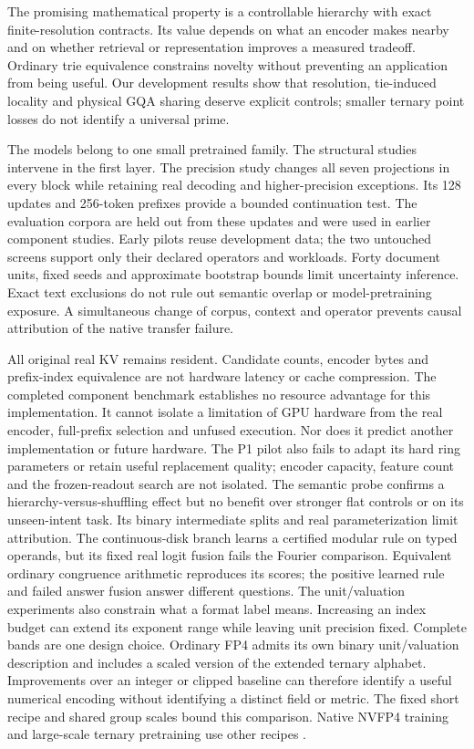\documentclass[11pt]{article}
\begin{document}
The promising mathematical property is a controllable hierarchy with exact
finite-resolution contracts. Its value depends on what an encoder makes
nearby and on whether retrieval or representation improves a measured
tradeoff. Ordinary trie equivalence constrains novelty without preventing
an application from being useful. Our development results show that
resolution, tie-induced locality and physical GQA sharing deserve explicit
controls; smaller ternary point losses do not identify a universal prime.

The models belong to one small pretrained family. The structural studies
intervene in the first layer. The precision study changes all seven
projections in every block while retaining real decoding and higher-precision
exceptions. Its 128 updates and 256-token prefixes provide a bounded
continuation test. The evaluation corpora are held out from these updates
and were used in earlier component studies. Early pilots reuse development data; the two
untouched screens support only their declared operators and workloads.
Forty document units, fixed seeds and approximate bootstrap bounds limit
uncertainty inference. Exact text exclusions do not rule out semantic overlap
or model-pretraining exposure. A simultaneous change of corpus, context and
operator prevents causal attribution of the native transfer failure.

All original real KV remains resident. Candidate counts, encoder bytes and
prefix-index equivalence are not hardware latency or cache compression.
The completed component benchmark establishes no resource advantage for this
implementation. It cannot isolate a limitation of GPU hardware from the
real encoder, full-prefix selection and unfused execution. Nor does it
predict another implementation or future hardware. The P1 pilot also fails
to adapt its hard ring parameters or retain useful replacement quality;
encoder capacity, feature count and the frozen-readout search are not isolated.
The semantic probe confirms a hierarchy-versus-shuffling effect but no benefit
over stronger flat controls or on its unseen-intent task. Its binary
intermediate splits and real parameterization limit attribution.
The continuous-disk branch learns a certified modular rule on typed operands,
but its fixed real logit fusion fails the Fourier comparison. Equivalent
ordinary congruence arithmetic reproduces its scores; the positive learned
rule and failed answer fusion answer different questions.
The unit/valuation experiments also constrain what a format label means.
Increasing an index budget can extend its exponent range while leaving unit
precision fixed. Complete bands are one design choice. Ordinary FP4 admits
its own binary unit/valuation description and includes a scaled version of
the extended ternary alphabet. Improvements over an integer or clipped
baseline can therefore identify a useful numerical encoding without
identifying a distinct field or metric. The fixed short recipe and shared
group scales bound this comparison. Native NVFP4 training and large-scale
ternary pretraining use other recipes
\citep{nvidia2026nvfp4,ma2024era,ma2025bitnet,liu2025paretoq}.
\end{document}
